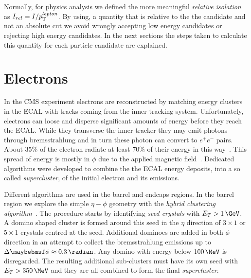 Normally, for physics analysis we defined the more meaningful \textit{relative isolation} as $I_{rel} = I/p_{\mathrm{T}}^{lepton}$. By using, a quantity that is relative to the the candidate \pt and not an absolute cut we avoid wrongly accepting low energy candidates or rejecting high energy candidates. In the next sections the steps taken to calculate this quantity for each particle candidate are explained.

\section{Electrons}
\label{SECTION:EventReconstructionAndSimulation_Electrons}


In the \gls{CMS} experiment electrons are reconstructed by matching energy clusters in the \gls{ECAL} with tracks coming from the inner tracking system. Unfortunately, electrons can loose and disperse significant amounts of energy before they reach the \gls{ECAL}. While they transverse the inner tracker they may emit photons through bremsstrahlung and in turn these photon can convert to $e^+e^-$ pairs. About 35\% of the electron radiate at least 70\% of their energy in this way~\cite{ARTICLE:CMSElectronReconstruction}. This spread of energy is mostly in $\phi$ due to the applied magnetic field~\cite{ARTICLE:CMSElectronReconstructionECAL}. Dedicated algorithms were developed to combine the the \gls{ECAL} energy deposits, into a so called \textit{supercluster}, of the initial electron and its emissions.

Different algorithms are used in the barrel and endcaps regions. In the barrel region we explore the simple $\eta-\phi$ geometry with the \textit{hybrid clustering algorithm}~\cite{ARTICLE:CMSElectronReconstruction8TeV}. The procedure starts by identifying \textit{seed crystals} with $E_T>1\,\GeV$. A domino shaped cluster is formed around this seed in the $\eta$ direction of $3 \times 1$ or $5 \times 1$ crystals centred at the seed. Additional dominoes are added in both $\phi$ direction in an attempt to collect the bremsstrahlung emissions up to $\Delta\phi \approx 0.3\,\radian$. Any domino with energy below $100\,\MeV$ is disregarded. The resulting additional sub-clusters must have its own seed with $E_T>350\,\MeV$ and they are all combined to form the final \textit{supercluster}. 

